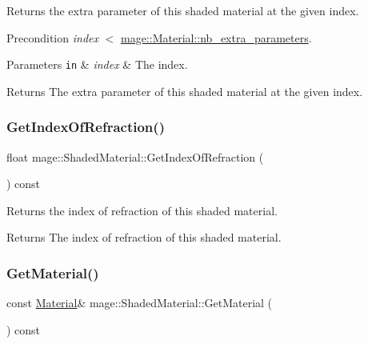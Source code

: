 Returns the extra parameter of this shaded material at the given index.

\begin{DoxyPrecond}{Precondition}
{\itshape index} {\ttfamily $<$} \hyperlink{structmage_1_1_material_a91e2bfd0c66c244bbae0faddbee1119f}{mage\+::\+Material\+::nb\+\_\+extra\+\_\+parameters}. 
\end{DoxyPrecond}

\begin{DoxyParams}[1]{Parameters}
\mbox{\tt in}  & {\em index} & The index. \\
\hline
\end{DoxyParams}
\begin{DoxyReturn}{Returns}
The extra parameter of this shaded material at the given index. 
\end{DoxyReturn}
\hypertarget{structmage_1_1_shaded_material_a4078cfbed3a919214428ab01d991b589}{}\label{structmage_1_1_shaded_material_a4078cfbed3a919214428ab01d991b589} 
\subsubsection{\texorpdfstring{Get\+Index\+Of\+Refraction()}{GetIndexOfRefraction()}}
{\footnotesize\ttfamily float mage\+::\+Shaded\+Material\+::\+Get\+Index\+Of\+Refraction (\begin{DoxyParamCaption}{ }\end{DoxyParamCaption}) const\hspace{0.3cm}{\ttfamily [noexcept]}}

Returns the index of refraction of this shaded material.

\begin{DoxyReturn}{Returns}
The index of refraction of this shaded material. 
\end{DoxyReturn}
\hypertarget{structmage_1_1_shaded_material_a4de9a6fe5389da19cbe3e5b073622374}{}\label{structmage_1_1_shaded_material_a4de9a6fe5389da19cbe3e5b073622374} 
\subsubsection{\texorpdfstring{Get\+Material()}{GetMaterial()}}
{\footnotesize\ttfamily const \hyperlink{structmage_1_1_material}{Material}\& mage\+::\+Shaded\+Material\+::\+Get\+Material (\begin{DoxyParamCaption}{ }\end{DoxyParamCaption}) const\hspace{0.3cm}{\ttfamily [noexcept]}}

